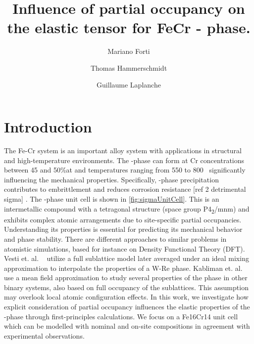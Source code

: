\documentclass[superscriptaddress, 12pt]{revtex4-2}%
\date{}
\begin{document}
\title{Influence of partial occupancy on the elastic tensor for FeCr \textsigma - phase.}

\author{Mariano Forti} 

\author{Thomas Hammerschmidt} \email{}

\author{Guillaume Laplanche} \email{}


\maketitle

\section{Introduction}

The Fe-Cr system is an important alloy system with applications in structural and high-temperature environments.
The \textsigma-phase can form at Cr concentrations between 45 and 50\%at and temperatures ranging from 550 to 800\textdegree ~\cite{laplanche_phase_2018} significantly influencing the mechanical properties.
Specifically, \textsigma-phase precipitation contributes to embrittlement and reduces corrosion resistance {\color{red}  [ref 2 detrimental sigma] }.
The \textsigma-phase unit cell is shown in \autoref{fig:sigmaUnitCell}.
This is an intermetallic compound with a tetragonal structure (space group P4\textsubscript{2}/mnm) and exhibits complex atomic arrangements due to site-specific partial occupancies.
Understanding its properties is essential for predicting its mechanical behavior and phase stability.
There are different approaches to similar problems in atomistic simulations, based for instance on Density Functional Theory (DFT).
Vesti et. al. ~\cite{vesti_ab-initio_2023} utilize a full sublattice model later averaged under an ideal mixing approximation to interpolate the properties of a W-Re \textsigma phase.
Kabliman et. al. ~\cite{kabliman_ab_2012} use a mean field approximation to study several properties of the \textsigma phase in other binary systems, also based on full occupancy of the sublattices.
This assumption may overlook local atomic configuration effects.
In this work, we investigate how explicit consideration of partial occupancy influences the elastic properties of the \textsigma-phase through first-principles calculations.
We focus on a Fe16Cr14 unit cell which can be modelled with nominal and on-site compositions in agreement with experimental observations.
\end{document}
